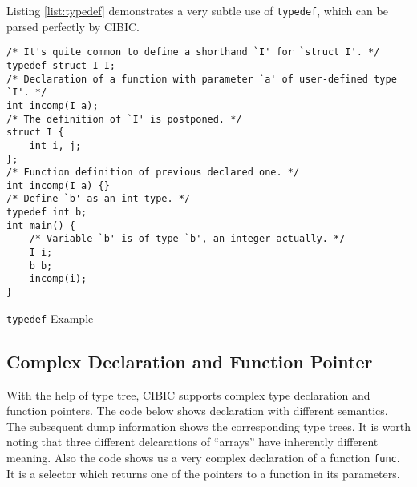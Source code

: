 \documentclass[10pt, a4paper]{article}
\begin{document}
Listing \ref{list:typedef} demonstrates a very subtle use of \texttt{typedef}, which can be parsed perfectly by CIBIC.

\begin{listing}[H]
    \centering
    \begin{verbatim}
/* It's quite common to define a shorthand `I' for `struct I'. */
typedef struct I I;
/* Declaration of a function with parameter `a' of user-defined type `I'. */
int incomp(I a);
/* The definition of `I' is postponed. */
struct I {
    int i, j;
};
/* Function definition of previous declared one. */
int incomp(I a) {}
/* Define `b' as an int type. */
typedef int b;
int main() {
    /* Variable `b' is of type `b', an integer actually. */
    I i;
    b b;
    incomp(i);
}
\end{verbatim}
\caption {\texttt{typedef} Example}
\label {list:typedef}
\end{listing}
\newpage
\subsection{Complex Declaration and Function Pointer}
With the help of type tree, CIBIC supports complex type declaration and function
pointers. The code below shows declaration with different semantics. The
subsequent dump information shows the corresponding type trees. It is worth
noting that three different delcarations of ``arrays'' have inherently
different meaning. Also the code shows us a very complex declaration of a
function \texttt{func}. It is a selector which returns one of the pointers to a
function in its parameters.
\end{document}
